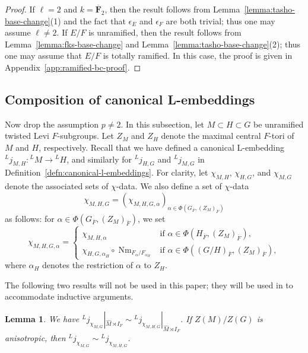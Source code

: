 \documentclass[reqno]{amsart}
\numberwithin{equation}{subsection}
\newcommand{\F}{\mathbf{F}}
\newcommand{\ol}[1]{\overline{#1}}
\newcommand{\wh}[1]{\widehat{#1}}
\newcommand{\co}{\colon}
\newcommand{\ld}{{}^L}
\DeclareMathOperator{\Nm}{Nm}
\newtheorem{lemma}[thm]{Lemma}
\theoremstyle{remark}
\numberwithin{equation}{subsection}
\numberwithin{figure}{subsection}
\begin{document}
\begin{proof}
If $\ell = 2$ and $k = \ol\F_2$, then the result follows from Lemma~\ref{lemma:tasho-base-change}(1) and the fact that $\epsilon_E$ and $\epsilon_F$ are both trivial; thus one may assume $\ell \neq 2$. If $E/F$ is unramified, then the result follows from Lemma~\ref{lemma:fks-base-change} and Lemma~\ref{lemma:tasho-base-change}(2); thus one may assume that $E/F$ is totally ramified. In this case, the proof is given in Appendix~\ref{app:ramified-bc-proof}.
\end{proof}



\subsection{Composition of canonical L-embeddings}

Now drop the assumption $p \neq 2$. In this subsection, let $M \subset H \subset G$ be unramified twisted Levi $F$-subgroups. Let $Z_M$ and $Z_H$ denote the maximal central $F$-tori of $M$ and $H$, respectively. Recall that we have defined a canonical L-embedding $\ld j_{M, H}\co \ld M \to \ld H$, and similarly for $\ld j_{H,G}$ and $\ld j_{M,G}$ in Definition~\ref{defn:canonical-l-embeddings}. For clarity, let $\chi_{M,H}$, $\chi_{H,G}$, and $\chi_{M,G}$ denote the associated sets of $\chi$-data. We also define a set of $\chi$-data
\[
\chi_{M,H,G} = (\chi_{M,H,G,\alpha})_{\alpha \in \Phi(G_{\ol F}, (Z_M)_{\ol F})}
\]
as follows: for $\alpha \in \Phi(G_{\ol F}, (Z_M)_{\ol F})$, we set
\[
\chi_{M,H,G,\alpha} = \begin{cases}
\chi_{M,H,\alpha} &\text{if } \alpha \in \Phi(H_{\ol F}, (Z_M)_{\ol F}), \\
\chi_{H,G,\alpha_H} \circ \Nm_{F_\alpha/F_{\alpha_H}} &\text{if } \alpha \in \Phi((G/H)_{\ol F}, (Z_M)_{\ol F}),
\end{cases}
\]
where $\alpha_H$ denotes the restriction of $\alpha$ to $Z_H$.

The following two results will not be used in this paper; they will be used in \cite{CF26b} to accommodate inductive arguments.

\begin{lemma}\label{lemma:canonical-change-of-chi-data}
We have $\ld j_{\chi_{M,G}}|_{\wh M \rtimes I_F} \sim \ld j_{\chi_{M,H,G}}|_{\wh M \rtimes I_F}$. If $Z(M)/Z(G)$ is anisotropic, then $\ld j_{\chi_{M,G}} \sim \ld j_{\chi_{M,H,G}}$.
\end{lemma}
\end{document}
